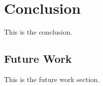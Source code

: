 \chapter{Conclusion}

This is the conclusion. \bigskip

\section{Future Work}

This is the future work section. \bigskip
